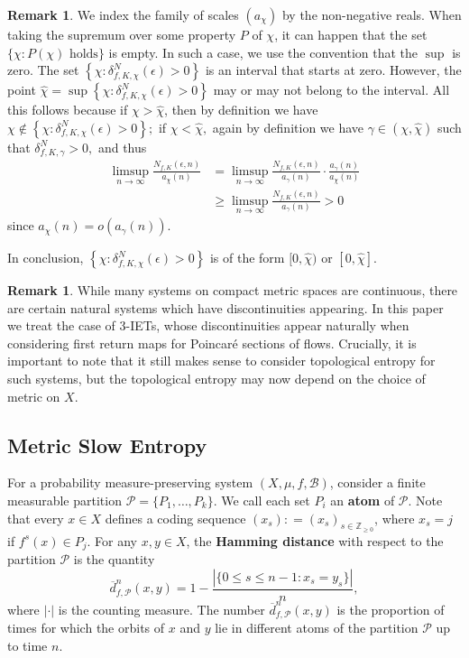 \documentclass[oneside]{amsart}
\theoremstyle{plain}
\theoremstyle{definition}
\newtheorem{RMK}[THM]{Remark}
\newcommand{\dfn}{\mathrel{\mathop:}=}
\newcommand{\<}{\langle}
\renewcommand{\>}{\rangle}
\renewcommand{\P}{\mathcal{P}}
\newcommand{\Z}{\mathbb{Z}}
\newcommand{\B}{\mathcal{B}}
\newcommand{\e}{\epsilon}
\renewcommand{\bar}{\overline}
\renewcommand{\|}{|\!|} %
\begin{document}
\begin{RMK}
\label{rmk:SetPostive}
    We index the family of scales $(a_\chi)$ by the non-negative reals. When taking the supremum over some property $P$ of $\chi$, it can happen that the set $\{\chi:P(\chi) \text{ holds}\}$ is empty. In such a case, we use the convention that the $\sup$ is zero. 
    The set $\left\{ \chi: \delta_{f,K,\chi}^N(\e)>0 \right\}$ is an interval that starts at zero. However, the point $\hat\chi = \sup \left\{ \chi: \delta_{f,K,\chi}^N(\e)>0 \right\}$ may or may not belong to the interval. All this follows because if $\chi>\hat{\chi}$, then by definition we have $\chi \not\in \left\{ \chi: \delta_{f,K,\chi}^N(\e)>0 \right\};$ if $\chi < \hat{\chi},$ again by definition we have $\gamma \in (\chi, \hat{\chi}) $ such that $\delta ^N _{f, K ,\gamma} > 0,$ and thus 
    \begin{equation*}
        \begin{split}
            \limsup_{n\to \infty}  \frac{N_{f,K}(\e,n)}{a_\chi(n)}& = \limsup_{n\to \infty}  \frac{N_{f,K}(\e,n)}{a_{\gamma}(n)} \cdot \frac{a_{\gamma}(n)}{a_\chi(n)} \\
            & \geq \limsup_{n\to \infty}  \frac{N_{f,K}(\e,n)}{a_{\gamma}(n)} >0
        \end{split}
    \end{equation*}
    since $a_{\chi} (n) = o(a_{\gamma}(n))$. 

    
    In conclusion, $\left\{ \chi: \delta_{f,K,\chi}^N(\e)>0 \right\}$ is of the form $[0,\hat{\chi})$ or $[0,\hat{\chi}]$.
\end{RMK}

\begin{RMK}
\label{rmk:discontinuities}
    While many systems on compact metric spaces are continuous, there are certain natural systems which have discontinuities appearing. In this paper we treat the case of 3-IETs, whose discontinuities appear naturally when considering first return maps for Poincar\'{e} sections of flows. Crucially, it is important to note that it still makes sense to consider topological entropy for such systems, but the topological entropy may now depend on the choice of metric on $X$.
\end{RMK}

\subsection{Metric Slow Entropy}

For a probability measure-preserving system $(X,\mu,f,\B)$, consider a finite measurable partition $\P=\{P_1,\dots,P_k\}$. We call each set $P_i$ an {\bf atom} of $\P$. Note that every $x \in X$ defines a coding sequence $(x_s) \dfn (x_s)_{s \in \Z_{\ge 0}}$, where $x_s=j$ if $f^{s}(x) \in P_j$.
For any $x,y \in X$, the {\bf Hamming distance} with respect to the partition $\P$ is the quantity
\begin{equation*}
    \bar{d}_{f,\P}^n(x,y) = 1-\frac{|\{0\le s\le n-1: x_s=y_s\}|}{n},
\end{equation*} 
where $|\cdot|$ is the counting measure. The number $\bar{d}_{f,\P}^n(x,y)$ is the proportion of times for which the orbits of 
$x$ and $y$ lie in different atoms of the partition $\P$ up to time $n$.
\end{document}
